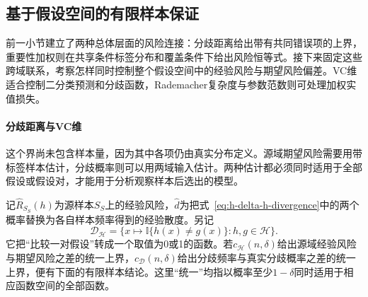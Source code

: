 \subsection{基于假设空间的有限样本保证}
\label{sec:adaptation-classwide-bounds}

前一小节建立了两种总体层面的风险连接：分歧距离给出带有共同错误项的上界，重要性加权则在共享条件标签分布和覆盖条件下给出风险恒等式。接下来固定这些跨域联系，考察怎样同时控制整个假设空间中的经验风险与期望风险偏差。VC维适合控制二分类预测和分歧函数，Rademacher复杂度与参数范数则可处理加权实值损失。

\paragraph{分歧距离与VC维}

这个界尚未包含样本量，因为其中各项仍由真实分布定义。源域期望风险需要用带标签样本估计，分歧概率则可以用两域输入估计。两种估计都必须同时适用于全部假设或假设对，才能用于分析观察样本后选出的模型。

记$\widehat R_{S_S}(h)$为源样本$S_S$上的经验风险，$\widehat d$为把式~\eqref{eq:h-delta-h-divergence}中的两个概率替换为各自样本频率得到的经验散度。另记
\[
 \mathcal D_{\mathcal H}
 =\{x\mapsto\mathbb I\{h(x)\neq g(x)\}:h,g\in\mathcal H\}.
\]
它把“比较一对假设”转成一个取值为0或1的函数。若$c_{\mathcal H}(n,\delta)$给出源域经验风险与期望风险之差的统一上界，$c_{\mathcal D}(n,\delta)$给出分歧频率与真实分歧概率之差的统一上界，便有下面的有限样本结论。这里“统一”均指以概率至少$1-\delta$同时适用于相应函数空间的全部函数。

